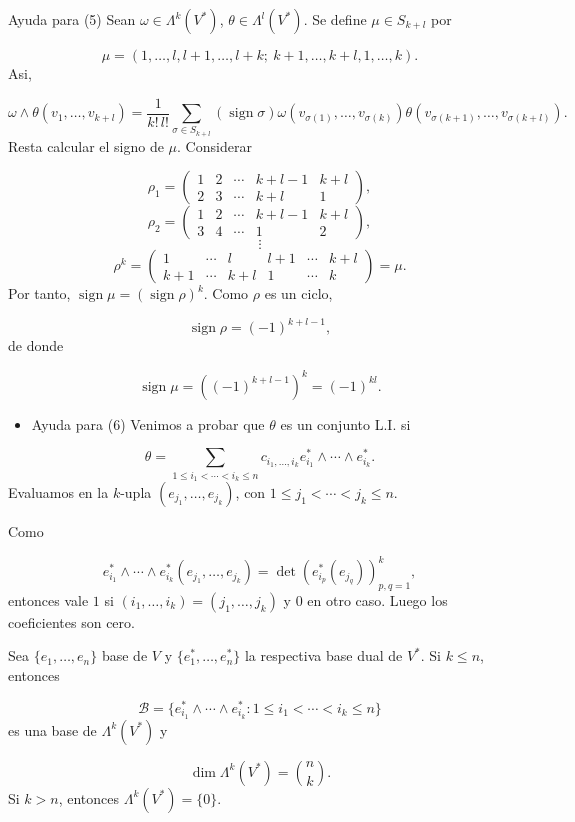 \begin{bookproof}{Ayuda para (5)}
Sean $\omega\in\Lambda^k(V^*)$, $\theta\in\Lambda^l(V^*)$. Se define $\mu\in S_{k+l}$ por

\[
\mu=(1,\ldots,l,l+1,\ldots,l+k;\ k+1,\ldots,k+l,1,\ldots,k).
\]
Asi,

\[
\omega\wedge\theta(v_1,\ldots,v_{k+l}) =\frac1{k!\,l!}\sum_{\sigma\in S_{k+l}}(\operatorname{sign}\sigma)\omega(v_{\sigma(1)},\ldots,v_{\sigma(k)}) \theta(v_{\sigma(k+1)},\ldots,v_{\sigma(k+l)}).
\]
Resta calcular el signo de $\mu$. Considerar

\[
\rho_1=\begin{pmatrix} 1&2&\cdots&k+l-1&k+l\\ 2&3&\cdots&k+l&1 \end{pmatrix},
\]
\[
\rho_2=\begin{pmatrix} 1&2&\cdots&k+l-1&k+l\\ 3&4&\cdots&1&2 \end{pmatrix},
\]
\[
\vdots
\]
\[
\rho^k=\begin{pmatrix} 1&\cdots&l&l+1&\cdots&k+l\\ k+1&\cdots&k+l&1&\cdots&k \end{pmatrix}=\mu.
\]
Por tanto, $\operatorname{sign}\mu=(\operatorname{sign}\rho)^k$. Como $\rho$ es un ciclo,

\[
\operatorname{sign}\rho=(-1)^{k+l-1},
\]
de donde

\[
\operatorname{sign}\mu=\left((-1)^{k+l-1}\right)^k=(-1)^{kl}.
\]
\begin{itemize}
\item Ayuda para (6) Venimos a probar que $\theta$ es un conjunto L.I. si
\end{itemize}
\[
\theta=\sum_{1\le i_1<\cdots<i_k\le n}c_{i_1,\ldots,i_k}e^*_{i_1}\wedge\cdots\wedge e^*_{i_k}.
\]
Evaluamos en la $k$-upla $(e_{j_1},\ldots,e_{j_k})$, con $1\le j_1<\cdots<j_k\le n$.

Como

\[
e^*_{i_1}\wedge\cdots\wedge e^*_{i_k}(e_{j_1},\ldots,e_{j_k}) = \det(e^*_{i_p}(e_{j_q}))_{p,q=1}^k,
\]
entonces vale $1$ si $(i_1,\ldots,i_k)=(j_1,\ldots,j_k)$ y $0$ en otro caso. Luego los coeficientes son cero.

\bookqed
\end{bookproof}
\label{blk:8619e2}
\begin{booktheorem}{}
Sea $\{e_1,\ldots,e_n\}$ base de $V$ y $\{e^*_1,\ldots,e^*_n\}$ la respectiva base dual de $V^*$. Si $k\le n$, entonces

\[
\mathcal B=\{e^*_{i_1}\wedge\cdots\wedge e^*_{i_k}:1\le i_1<\cdots<i_k\le n\}
\]
es una base de $\Lambda^k(V^*)$ y

\[
\dim\Lambda^k(V^*)=\binom nk.
\]
Si $k>n$, entonces $\Lambda^k(V^*)=\{0\}$.

\end{booktheorem}
